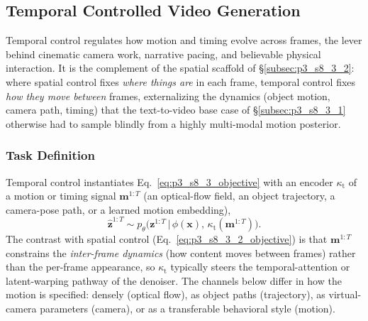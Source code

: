 \subsection{Temporal Controlled Video Generation}
\label{subsec:p3_s8_3_3}

Temporal control regulates how motion and timing evolve across frames, the lever behind cinematic camera work, narrative pacing, and believable physical interaction. It is the complement of the spatial scaffold of §\ref{subsec:p3_s8_3_2}: where spatial control fixes \emph{where things are} in each frame, temporal control fixes \emph{how they move between} frames, externalizing the dynamics (object motion, camera path, timing) that the text-to-video base case of §\ref{subsec:p3_s8_3_1} otherwise had to sample blindly from a highly multi-modal motion posterior.

\subsubsection{Task Definition}
\label{subsubsec:p3_s8_3_3_task}
Temporal control instantiates Eq.~\eqref{eq:p3_s8_3_objective} with an encoder $\kappa_{\text{t}}$ of a motion or timing signal $\mathbf{m}^{1:T}$ (an optical-flow field, an object trajectory, a camera-pose path, or a learned motion embedding),
\begin{equation}
\hat{\mathbf{z}}^{1:T}\sim p_\theta\!\big(\mathbf{z}^{1:T}\,\big|\,\phi(\mathbf{x}),\,\kappa_{\text{t}}(\mathbf{m}^{1:T})\big).
\label{eq:p3_s8_3_3_objective}
\end{equation}
The contrast with spatial control (Eq.~\eqref{eq:p3_s8_3_2_objective}) is that $\mathbf{m}^{1:T}$ constrains the \emph{inter-frame dynamics} (how content moves between frames) rather than the per-frame appearance, so $\kappa_{\text{t}}$ typically steers the temporal-attention or latent-warping pathway of the denoiser. The channels below differ in how the motion is specified: densely (optical flow), as object paths (trajectory), as virtual-camera parameters (camera), or as a transferable behavioral style (motion).

